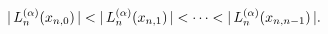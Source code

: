 \[|\mathop{L^{(\alpha)}_{n}\/}\nolimits\!\left(x_{n,0}\right)|<|\mathop{L^{(%
\alpha)}_{n}\/}\nolimits\!\left(x_{n,1}\right)|<\dots<|\mathop{L^{(\alpha)}_{n%
}\/}\nolimits\!\left(x_{n,n-1}\right)|.\]